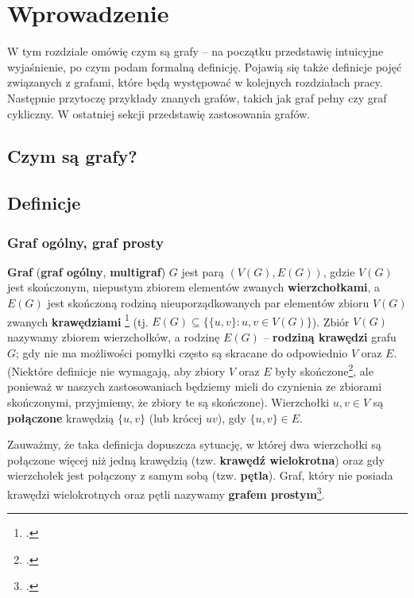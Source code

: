 \chapter{Wprowadzenie}

W tym rozdziale omówię czym są grafy -- na początku przedstawię intuicyjne wyjaśnienie, po czym podam formalną definicję. Pojawią się także definicje pojęć związanych z grafami, które będą występować w kolejnych rozdziałach pracy. Następnie przytoczę przykłady znanych grafów, takich jak graf pełny czy graf cykliczny. W ostatniej sekcji przedstawię zastosowania grafów.

\section{Czym są grafy?}

\section{Definicje}

\subsection*{Graf ogólny, graf prosty}
\textbf{Graf} (\textbf{graf ogólny}, \textbf{multigraf}) $G$ jest parą $(V(G),E(G))$, gdzie $V(G)$ jest skończonym, niepustym zbiorem elementów zwanych \textbf{wierzchołkami}, a $E(G)$ jest skończoną rodziną nieuporządkowanych par elementów zbioru $V(G)$ zwanych \textbf{krawędziami} \footcite[20]{wilson} (tj. $E(G) \subseteq \{\{u,v\} : u,v \in V(G)\}$). Zbiór $V(G)$ nazywamy zbiorem wierzchołków, a rodzinę $E(G)$ -- \textbf{rodziną krawędzi} grafu $G$; gdy nie ma możliwości pomyłki często są skracane do odpowiednio $V$ oraz $E$. (Niektóre definicje nie wymagają, aby zbiory $V$ oraz $E$ były skończone\footcite[143]{ross}, ale ponieważ w naszych zastosowaniach będziemy mieli do czynienia ze zbiorami skończonymi, przyjmiemy, że zbiory te są skończone).  Wierzchołki $u,v \in V$ są \textbf{połączone} krawędzią $\{u,v\}$ (lub krócej $uv$), gdy $\{u,v\} \in E$. 

Zauważmy, że taka definicja dopuszcza sytuację, w której dwa wierzchołki są połączone więcej niż jedną krawędzią (tzw. \textbf{krawędź wielokrotna}) oraz gdy wierzchołek jest połączony z samym sobą (tzw. \textbf{pętla}). Graf, który nie posiada krawędzi wielokrotnych oraz pętli nazywamy \textbf{grafem prostym}\footcite[19]{wilson}.

